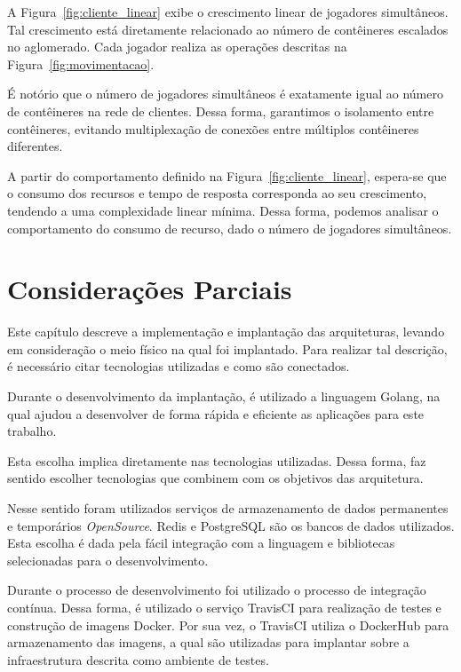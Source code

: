 A Figura~\ref{fig:cliente_linear} exibe o crescimento linear de jogadores simultâneos.
%
Tal crescimento está diretamente relacionado ao número de contêineres escalados no aglomerado.
%
Cada jogador realiza as operações descritas na Figura~\ref{fig:movimentacao}.

É notório que o número de jogadores simultâneos é exatamente igual ao número de contêineres na rede de clientes.
%
Dessa forma, garantimos o isolamento entre contêineres, evitando multiplexação de conexões entre múltiplos contêineres diferentes.


A partir do comportamento definido na Figura~\ref{fig:cliente_linear}, espera-se que o consumo dos recursos e tempo de resposta corresponda ao seu crescimento, tendendo a uma complexidade linear mínima.
%
Dessa forma, podemos analisar o comportamento do consumo de recurso, dado o número de jogadores simultâneos.


\section{Considerações Parciais}

Este capítulo descreve a implementação e implantação das arquiteturas, levando em consideração o meio físico na qual foi implantado.
%
Para realizar tal descrição, é necessário citar tecnologias utilizadas e como são conectados.

Durante o desenvolvimento da implantação, é utilizado a linguagem Golang, na qual ajudou a desenvolver de forma rápida e eficiente as aplicações para este trabalho.

Esta escolha implica diretamente nas tecnologias utilizadas.
%
Dessa forma, faz sentido escolher tecnologias que combinem com os objetivos das arquitetura.

Nesse sentido foram utilizados serviços de armazenamento de dados permanentes e temporários \textit{OpenSource}.
%
Redis e PostgreSQL são os bancos de dados utilizados.
%
Esta escolha é dada pela fácil integração com a linguagem e  bibliotecas selecionadas para o desenvolvimento.

Durante o processo de desenvolvimento foi utilizado o processo de integração contínua.
%
Dessa forma, é utilizado o serviço TravisCI para realização de testes e construção de imagens Docker.
%
Por sua vez, o TravisCI utiliza o DockerHub para armazenamento das imagens, a qual são utilizadas para implantar sobre a infraestrutura descrita como ambiente de testes.
